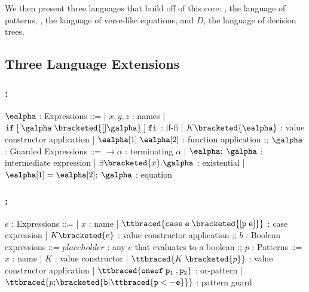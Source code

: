 \documentclass[]{article}
\begin{document}
We then present three languages that build off of this core: 
\Pplus, the language of patterns, \Vminus, the language of 
verse-like equations, and $D$, the language of decision trees. 

\subsection{Three Language Extensions}

\subsubsection{\Vminus:}

\begin{center}
    \begin{bnf}
    $\ealpha$ : \textsf{Expressions} ::=
    | $x, y, z$ : names
    | $\tt{if} \; \tt{[}\; \galpha \; \bracketed{[] \galpha} \;\tt{]} \; \tt{fi}$ : if-fi 
    | $K \bracketed{\ealpha}$ : value constructor application 
    | $\ealpha[1] \; \ealpha[2]$ : function application 
    ;;
    $\galpha$ : \textsf{Guarded Expressions} ::=  
    $\boldsymbol{\rightarrow}\alpha$ : terminating $\alpha$ 
    | $\ealpha; \; \galpha$ : intermediate expression 
    | $\exists \bracketed{x} \tt{.} \galpha$ : existential 
    | $\ealpha[1] = \ealpha[2]; \; \galpha$ : equation 
    \end{bnf}
\end{center}

\bigskip 

\subsubsection{\Pplus:}
\begin{center}
    \begin{bnf}
$e$ : \textsf{Expressions} ::=
    | $x$ : name
    | $\ttbraced{\tt{case} \; e \; \bracketed{\tt{[} p \; e \tt{]}}}$ : case expression 
    | $K \bracketed{e}$ : value constructor application 
    ;;
    $b$ : Boolean expressions ::=
     $\mathit{placeholder}$ : any $e$ that evaluates to a boolean 
    ;;
    $p$ : \textsf{Patterns} ::= $x$ : name 
    | $K$ : value constructor 
    | $\ttbraced{K \; \bracketed{p}}$ : value constructor application 
    | $\ttbraced{\tt{oneof} \; p_{1} \;, p_{2} }$ : or-pattern 
    | $\ttbraced{p \tt{;} \bracketed{b \vert \ttbraced{p  <- e}}}$ : pattern guard
    \end{bnf}
\end{center}
\end{document}
